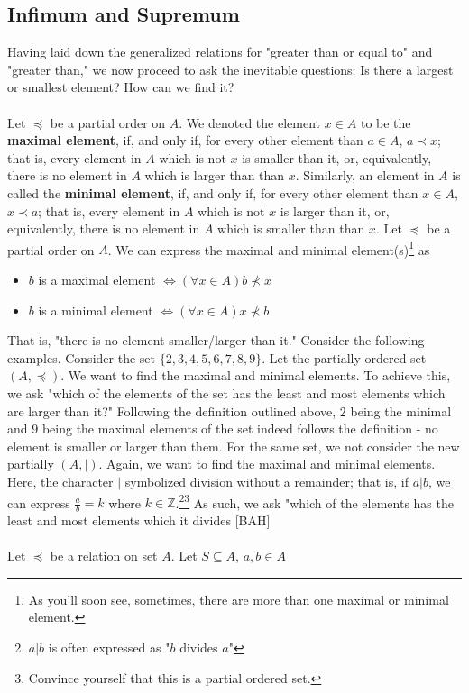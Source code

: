 \documentclass{tufte-handout} %
\theoremstyle{definition}
\theoremstyle{remark}
\newcommand{\Z}{\mathbb{Z}}
\begin{document}
\subsection{Infimum and Supremum}
Having laid down the generalized relations for "greater than or equal to" and "greater than," we now proceed to ask the inevitable questions: Is there a largest or smallest element? How can we find it? \\\\
Let $\preccurlyeq$ be a partial order on $A$. We denoted the element $x\in A$ to be the \textbf{maximal element}, if, and only if, for every other element than $a\in A$, $a\prec x$; that is, every element in $A$ which is not $x$ is smaller than it, or, equivalently, there is no element in $A$ which is larger than than $x$. Similarly, an element in $A$ is called the \textbf{minimal element}, if, and only if, for every other element than $x\in A$, $x \prec a$; that is, every element in $A$ which is not $x$ is larger than it, or, equivalently, there is no element in $A$ which is smaller than than $x$. Let $\preccurlyeq$ be a partial order on $A$. We can express the maximal and minimal element(s)\footnote{As you'll soon see, sometimes, there are more than one maximal or minimal element.} as
\begin{itemize}
    \item $b$ is a maximal element $\Longleftrightarrow  (\forall x\in A) b \not\prec x$
    \item $b    $ is a minimal element $\Longleftrightarrow(\forall x\in A) x \not\prec b$ 
\end{itemize}
That is, "there is no element smaller/larger than it." Consider the following examples. Consider the set $\{2,3,4,5,6,7,8,9\}$. Let the partially ordered set $(A,\preccurlyeq)$. We want to find the maximal and minimal elements. To achieve this, we ask "which of the elements of the set has the least and most elements which are larger than it?" Following the definition outlined above, $2$ being the minimal and $9$ being the maximal elements of the set indeed follows the definition - no element is smaller or larger than them. For the same set, we not consider the new partially $(A,|)$. Again, we want to find the maximal and minimal elements. Here, the character $|$ symbolized division without a remainder; that is, if $a|b$, we can express $\frac{a}{b}=k$ where $k\in \Z$.\footnote{$a|b$ is often expressed as "$b$ divides $a$"}\footnote{Convince yourself that this is a partial ordered set.} As such, we ask "which of the elements has the least and most elements which it divides [BAH]
\\\\
Let $\preccurlyeq$ be a relation on set $A$. Let $S\subseteq A$, $a,b\in A$
\end{document}
